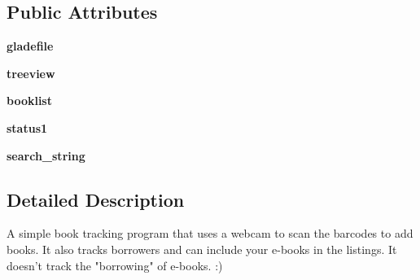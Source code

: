 \subsection*{Public Attributes}
\begin{DoxyCompactItemize}
\item 
\hypertarget{classsrc_1_1librarian_1_1librarian_a339612b89a0e80a39b0ea2e9d3ed839a}{
{\bfseries gladefile}}
\label{classsrc_1_1librarian_1_1librarian_a339612b89a0e80a39b0ea2e9d3ed839a}

\item 
\hypertarget{classsrc_1_1librarian_1_1librarian_a56018b542dccd5157570c29a9d77ba4b}{
{\bfseries treeview}}
\label{classsrc_1_1librarian_1_1librarian_a56018b542dccd5157570c29a9d77ba4b}

\item 
\hypertarget{classsrc_1_1librarian_1_1librarian_aef267f34ec9b09681dbab5736dc3062e}{
{\bfseries booklist}}
\label{classsrc_1_1librarian_1_1librarian_aef267f34ec9b09681dbab5736dc3062e}

\item 
\hypertarget{classsrc_1_1librarian_1_1librarian_aee6a4212fde721204917e3ba12509ac5}{
{\bfseries status1}}
\label{classsrc_1_1librarian_1_1librarian_aee6a4212fde721204917e3ba12509ac5}

\item 
\hypertarget{classsrc_1_1librarian_1_1librarian_a26ac2398971012ea0457ccbc512c3e24}{
{\bfseries search\_\-string}}
\label{classsrc_1_1librarian_1_1librarian_a26ac2398971012ea0457ccbc512c3e24}

\end{DoxyCompactItemize}


\subsection{Detailed Description}
\begin{DoxyVerb}
A simple book tracking program that uses a webcam to scan the barcodes
to add books.  It also tracks borrowers and can include your e-books
in the listings.  It doesn't track the "borrowing" of e-books. :)
\end{DoxyVerb}
 

